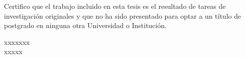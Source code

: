 


\setcounter{tocdepth}{5}



%

%

\renewcommand{\tablename}{Tabla}
\renewcommand{\listtablename}{{\'I}ndice de tablas}


\thispagestyle{empty}%
Certifico que el trabajo incluido en esta tesis es el resultado de tareas de investigación originales y que no ha sido presentado para optar a un título de postgrado en ninguna otra Universidad o Institución.
\vspace{0.5cm}
\begin{flushright}
\large{}\selectfont
xxxxxxx\\
\normalsize\sffamily
xxxxx
\end{flushright}

%

%

%
%
    
\tableofcontents


\renewcommand{\baselinestretch}{1.2} %






